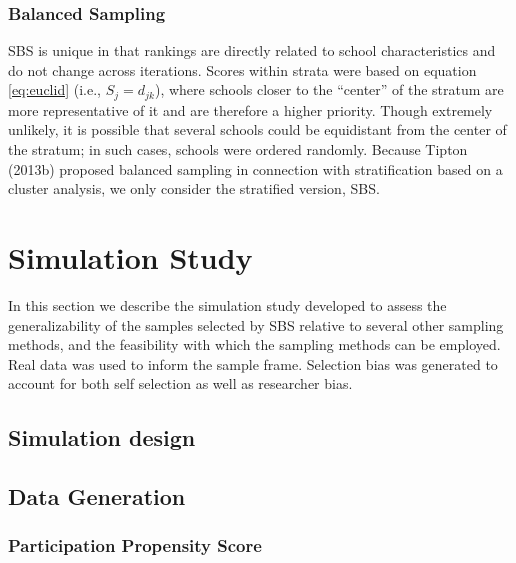 \documentclass[man,floatsintext]{apa6}
\begin{document}
\hypertarget{balanced-sampling-1}{%
\subsubsection{Balanced Sampling}\label{balanced-sampling-1}}

SBS is unique in that rankings are directly related to school characteristics and do not change across iterations. Scores within strata were based on equation \eqref{eq:euclid} (i.e., \(S_j = d_{jk}\)), where schools closer to the \enquote{center} of the stratum are more representative of it and are therefore a higher priority. Though extremely unlikely, it is possible that several schools could be equidistant from the center of the stratum; in such cases, schools were ordered randomly.
Because Tipton (2013b) proposed balanced sampling in connection with stratification based on a cluster analysis, we only consider the stratified version, SBS.

\hypertarget{simulation-study}{%
\section{Simulation Study}\label{simulation-study}}

In this section we describe the simulation study developed to assess the generalizability of the samples selected by SBS relative to several other sampling methods, and the feasibility with which the sampling methods can be employed. Real data was used to inform the sample frame.
Selection bias was generated to account for both self selection as well as researcher bias.

\hypertarget{simulation-design}{%
\subsection{Simulation design}\label{simulation-design}}

\hypertarget{data-generation}{%
\subsection{Data Generation}\label{data-generation}}

\hypertarget{participation-propensity-score}{%
\subsubsection{Participation Propensity Score}\label{participation-propensity-score}}
\end{document}
